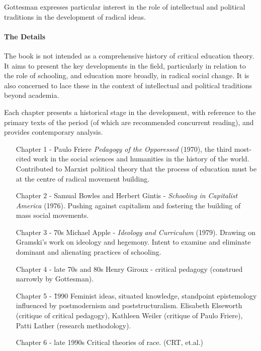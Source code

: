 \documentclass[10pt,titlepage]{book}
\begin{document}
Gottesman expresses particular interest in the role of intellectual and political traditions in the development of radical ideas.

\paragraph{The Details}

The book is not intended as a comprehensive history of critical education theory.
It aims to present the key developments in the field, particularly in relation to the role of schooling, and education more broadly, in radical social change.
It is also concerned to lace these in the context of intellectual and political traditions beyond academia.

Each chapter presents a historical stage in the development, with reference to the primary texts of the period (of which are recommended concurrent reading), and provides contemporary analysis.

\begin{itemize}
\item [Chapter 1 -]
  Paulo Friere \emph{Pedagogy of the Opporessed} (1970), the third most-cited work in the social sciences and humanities in the history of the world.
  Contributed to Marxist political theory that the process of education must be at the centre of radical movement building.
\item [Chapter 2 -]
  Samual Bowles and Herbert Gintis - \emph{Schooling in Capitalist America} (1976).
  Pushing against capitalism and fostering the building of mass social movements.
\item [Chapter 3 - 70s]
  Michael Apple - \emph{Ideology and Curriculum} (1979).  Drawing on Gramski's work on ideology and hegemony.
  Intent to examine and eliminate dominant and alienating practices of schooling.
\item [Chapter 4 - late 70s and 80s]
  Henry Giroux - critical pedagogy (construed narrowly by Gottesman).
\item [Chapter 5 - \~1990]
  Feminist ideas, situated knowledge, standpoint epistemology influenced by postmodernism and poststructuralism.
  Elisabeth Elseworth (critique of critical pedagogy), Kathleen Weiler (critique of Paulo Friere), Patti Lather (research methodology).
\item [Chapter 6 - late 1990s]
  Critical theories of race. (CRT, et.al.)
\end{itemize}

\pagebreak
\end{document}
